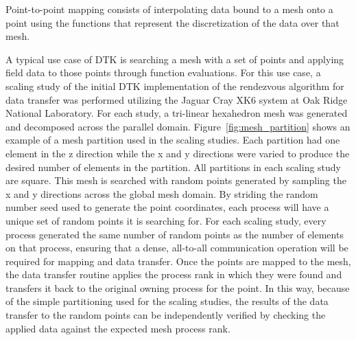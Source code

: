 \documentclass{mc2013}
\begin{document}
\label{subsec:point_to_point}

Point-to-point mapping consists of interpolating data bound to a mesh
onto a point using the functions that represent the discretization of
the data over that mesh. 

\label{subsec:volume_to_volume}

\label{subsec:integral_to_volume}

\label{sec:examples}

\label{subsec:cht}

\label{subsec:cfd_neutronics}

\label{sec:scaling_study}

A typical use case of DTK is searching a mesh with a set of points and
applying field data to those points through function evaluations. For
this use case, a scaling study of the initial DTK implementation of
the rendezvous algorithm for data transfer was performed utilizing the
Jaguar Cray XK6 system at Oak Ridge National Laboratory. For each
study, a tri-linear hexahedron mesh was generated and decomposed
across the parallel domain. Figure~\ref{fig:mesh_partition} shows an
example of a mesh partition used in the scaling studies. Each
partition had one element in the z direction while the x and y
directions were varied to produce the desired number of elements in
the partition. All partitions in each scaling study are square. This
mesh is searched with random points generated by sampling the x and y
directions across the global mesh domain.  By striding the random
number seed used to generate the point coordinates, each process will
have a unique set of random points it is searching for. For each
scaling study, every process generated the same number of random
points as the number of elements on that process, ensuring that a
dense, all-to-all communication operation will be required for mapping
and data transfer. Once the points are mapped to the mesh, the data
transfer routine applies the process rank in which they were found and
transfers it back to the original owning process for the point. In
this way, because of the simple partitioning used for the scaling
studies, the results of the data transfer to the random points can be
independently verified by checking the applied data against the
expected mesh process rank.
\end{document}
